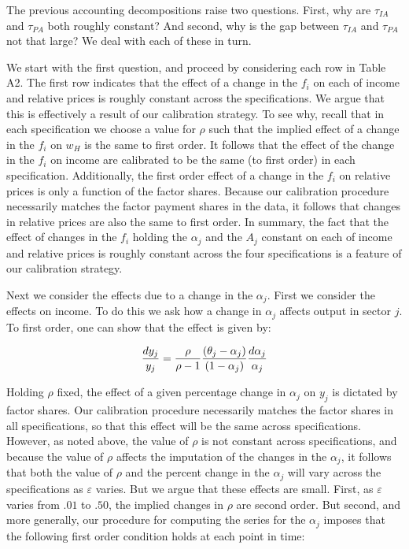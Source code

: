 \documentclass[12pt,english]{article}
\begin{document}
The previous accounting decompositions raise two questions. First, why are
$\tau _{IA}$ and $\tau _{PA}$  both roughly constant? And second, why is the gap between $%
\tau _{IA}$ and $\tau _{PA}$ not that large? We deal with each of these in
turn.

We start with the first question, and proceed by considering each row in
Table A2. The first row indicates that the effect of a change in the $f_{i}$
on each of income and relative prices is roughly constant across the
specifications. We argue that this is effectively a result of our
calibration strategy. To see why, recall that in each specification we
choose a value for $\rho $ such that the implied effect of a change in the $%
f_{i}$ on $w_{H}$ is the same to first order. It follows that the effect of
the change in the $f_{i}$ on income are calibrated to be the same (to first
order) in each specification. Additionally, the first order effect of a
change in the $f_{i}$ on relative prices is only a function of the factor
shares. Because our calibration procedure necessarily matches the factor
payment shares in the data, it follows that changes in relative prices are
also the same to first order. In summary, the fact that the effect of
changes in the $f_{i}$ holding the $\alpha _{j}$ and the $A_{j}$ constant on
each of income and relative prices is roughly constant across the four
specifications is a feature of our calibration strategy.

Next we consider the effects due to a change in the $\alpha _{j}$. First we
consider the effects on income. To do this we ask how a change in $\alpha
_{j}$ affects output in sector $j$. To first order, one can show that the
effect is given by:

\begin{equation*}
\frac{dy_{j}}{y_{j}}=\frac{\rho }{\rho -1}\frac{(\theta _{j}-\alpha _{j})}{%
(1-\alpha _{j})}\frac{d\alpha _{j}}{\alpha _{j}}  \label{pacoequation}
\end{equation*}

Holding $\rho $ fixed, the effect of a given percentage change in $\alpha
_{j}$ on $y_{j}$ is dictated by factor shares. Our calibration procedure
necessarily matches the factor shares in all specifications, so that this
effect will be the same across specifications. However, as noted above, the
value of $\rho $ is not constant across specifications, and because the
value of $\rho $ affects the imputation of the changes in the $\alpha _{j}$,
it follows that both the value of $\rho $ and the percent change in the $%
\alpha _{j}$ will vary across the specifications as $\varepsilon $ varies.
But we argue that these effects are small. First, as $\varepsilon $ varies
from $.01$ to $.50$, the implied changes in $\rho $ are second order. But
second, and more generally, our procedure for computing the series for the $%
\alpha _{j}$ imposes that the following first order condition holds at each
point in time:
\end{document}
